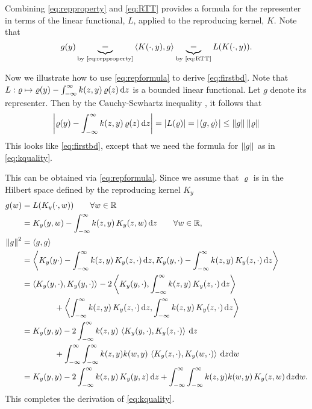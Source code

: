 \documentclass[letterpaper]{amsart}
\newcommand{\KY}{K_y}
\begin{document}
Combining \eqref{eq:repproperty} and \eqref{eq:RTT} provides a formula for the representer in terms of the linear functional, $L$, applied to the reproducing kernel, $K$.  Note that
\begin{equation} \label{eq:repformula}
    g(y) \underbrace{=}_{\text{by \eqref{eq:repproperty}}} \left \langle K(\cdot, y), g \right \rangle_{{}}
    \underbrace{=}_{\text{by \eqref{eq:RTT}}} L(K(\cdot,y)) .
\end{equation}

Now we illustrate how to use \eqref{eq:repformula} to derive \eqref{eq:firstbd}.  Note that $L: \varrho \mapsto \varrho(y) - \int_{-\infty}^{\infty} k(z,y) \, \varrho(z) \, {\rm d} z$ is a bounded linear functional.  Let $g$ denote its representer.  Then by the Cauchy-Scwhartz inequality \cite{CauchySchwarzWiki}, it follows that
\begin{equation}
    \left \lvert \varrho(y) - \int_{-\infty}^{\infty} k(z,y) \, \varrho(z) \, {\rm d} z \right \rvert = \left \lvert L(\varrho) \right \rvert = \left \lvert \left \langle g, \varrho \right \rangle_{{}} \right \rvert \le \left \lVert g \right \rVert_{{}}\left \lVert \varrho \right \rVert_{{}}
\end{equation}
This looks like  \eqref{eq:firstbd}, except that we need the formula for $\left \lVert g \right \rVert_{{}}$ as in \eqref{eq:kquality}.

This can be obtained via \eqref{eq:repformula}.  Since we assume that $\varrho$ is in the Hilbert space defined by the reproducing kernel $\KY$
\begin{align*}
    g(w) &= L(\KY(\cdot,w)) \qquad \forall w \in \reals \\
    & = \KY(y,w) - \int_{-\infty}^{\infty} k(z,y) \, \KY(z,w) \, \dif z \qquad \forall w \in \reals, \\
    \norm{g}^2 &= \ip{g}{g} \\
    & = \ip{\KY(y\cdot) - \int_{-\infty}^{\infty} k(z,y) \, \KY(z,\cdot) \, \dif z}{\KY(y,\cdot) - \int_{-\infty}^{\infty} k(z,y) \, \KY(z,\cdot) \, \dif z} \\
    & = \ip{\KY(y,\cdot)}{\KY(y,\cdot)}
      - 2 \ip{\KY(y,\cdot)}{\int_{-\infty}^{\infty} k(z,y) \, \KY(z,\cdot) \, \dif z} \\
     & \qquad \qquad   + \ip{\int_{-\infty}^{\infty} k(z,y) \, \KY(z,\cdot) \, \dif z}{\int_{-\infty}^{\infty} k(z,y) \, \KY(z,\cdot) \, \dif z} \\
    & = \KY(y,y)
      - 2 \int_{-\infty}^{\infty} k(z,y) \, \ip{\KY(y,\cdot)}{\KY(z,\cdot)} \, \dif z \\
    & \qquad \qquad   + \int_{-\infty}^{\infty} \int_{-\infty}^{\infty} k(z,y) k(w,y) \, \ip{ \KY(z,\cdot)}{\KY(w,\cdot)} \,  \dif z\dif w \\
   & = \KY(y,y)
      - 2 \int_{-\infty}^{\infty} k(z,y) \, \KY(y,z) \, \dif z
     + \int_{-\infty}^{\infty} \int_{-\infty}^{\infty} k(z,y) k(w,y) \, \KY(z,w) \,  \dif z\dif w.
\end{align*}
This completes the derivation of \eqref{eq:kquality}.
\end{document}
